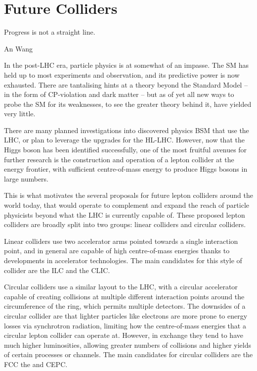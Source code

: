 \chapter{Future Colliders}
\label{chapter:colliders}

\epigraph{Progress is not a straight line.}{An Wang}

In the post-LHC era, particle physics is at somewhat of an impasse. The \acrfull{SM} has held up to most experiments and observation, and its predictive power is now exhausted. There are tantalising hints at a theory beyond the Standard Model -- in the form of CP-violation and dark matter -- but as of yet all new ways to probe the \acrshort{SM} for its weaknesses, to see the greater theory behind it, have yielded very little. 

There are many planned investigations into discovered physics \acrlong{BSM} that use the \acrfull{LHC}, or plan to leverage the upgrades for the \acrfull{HL-LHC}. However, now that the Higgs boson has been identified successfully, one of the most fruitful avenues for further research is the construction and operation of a lepton collider at the energy frontier, with sufficient centre-of-mass energy to produce Higgs bosons in large numbers.

This is what motivates the several proposals for future lepton colliders around the world today, that would operate to complement and expand the reach of particle physicists beyond what the \acrshort{LHC} is currently capable of. These proposed lepton colliders are broadly split into two groups: linear colliders and circular colliders. 

Linear colliders use two accelerator arms pointed towards a single interaction point, and in general are capable of high centre-of-mass energies thanks to developments in accelerator technologies. The main candidates for this style of collider are the \acrfull{ILC} and the \acrfull{CLIC}. 

Circular colliders use a similar layout to the \acrshort{LHC}, with a circular accelerator capable of creating collisions at multiple different interaction points around the circumference of the ring, which permits multiple detectors. The downsides of a circular collider are that lighter particles like electrons are more prone to energy losses via synchrotron radiation, limiting how the centre-of-mass energies that a circular lepton collider can operate at. However, in exchange they tend to have much higher luminosities, allowing greater numbers of collisions and higher yields of certain processes or channels. The main candidates for circular colliders are the \acrfull{FCC} the and \acrfull{CEPC}. 

